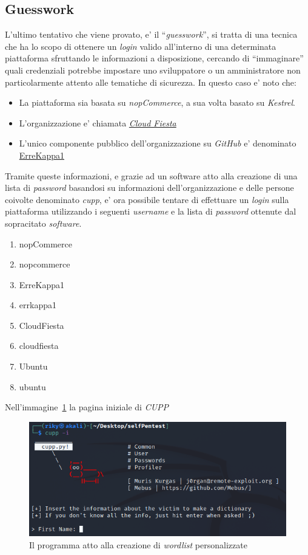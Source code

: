 \documentclass[a4paper]{report}
\newcommand{\quotes}[1]{``#1''}
\begin{document}
			\subsection{Guesswork}\label{guesswork}
				L'ultimo tentativo che viene provato, e' il \quotes{\emph{guesswork}}, si tratta di una tecnica che ha
				lo scopo di ottenere un \emph{login} valido all'interno di una determinata piattaforma sfruttando le
				informazioni a disposizione, cercando di \quotes{immaginare} quali credenziali potrebbe impostare uno
				sviluppatore o un amministratore non particolarmente attento alle tematiche di sicurezza.
				In questo caso e' noto che:
				\begin{itemize}
					\item La piattaforma sia basata su \emph{nopCommerce}, a sua volta basato su \emph{Kestrel}.
					\item L'organizzazione e' chiamata \href{https://github.com/Cloud-Fiesta}{\emph{Cloud Fiesta}}
					\item L'unico componente pubblico dell'organizzazione su \emph{GitHub} e' denominato \href{https://github.com/ErreKappa1}{ErreKappa1}
				\end{itemize}
				Tramite queste informazioni, e grazie ad un software atto alla creazione di una lista di \emph{password}
				basandosi su informazioni dell'organizzazione e delle persone coivolte denominato \emph{cupp}, e' ora
				possibile tentare di effettuare un \emph{login} sulla piattaforma utilizzando i seguenti \emph{username}
				e la lista di \emph{password} ottenute dal sopracitato \emph{software}.
				\begin{enumerate}
					\item nopCommerce
					\item nopcommerce
					\item ErreKappa1
					\item errkappa1
					\item CloudFiesta
					\item cloudfiesta
					\item Ubuntu
					\item ubuntu
				\end{enumerate}
				Nell'immagine~\ref{fig:cupp} la pagina iniziale di \emph{CUPP}
				\begin{figure}[H]
					\includegraphics[width=\textwidth]{CUPP.png}
					\caption{Il programma atto alla creazione di \emph{wordlist} personalizzate}\label{fig:cupp}
				\end{figure}
\end{document}
